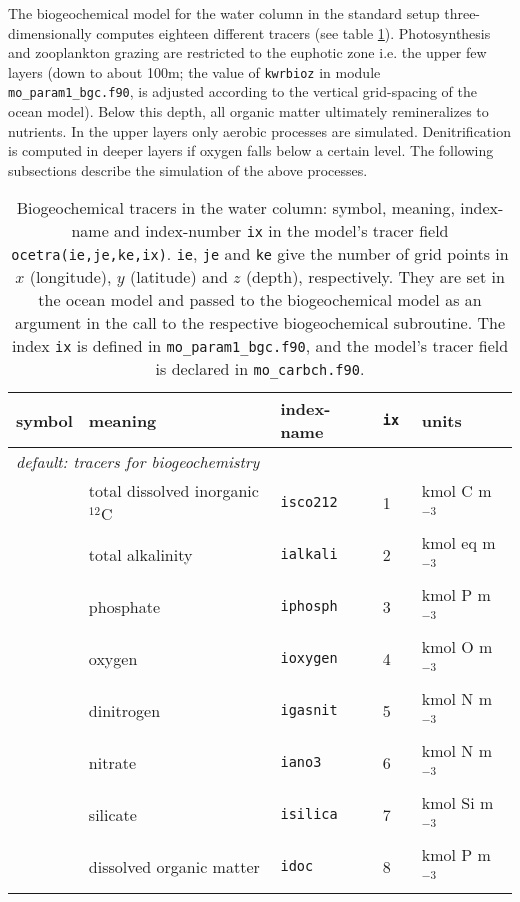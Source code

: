\documentclass[11pt,a4paper,fleqn,twoside]{article}
\def\pho{\text{\textsc{po$_4$}}\,}
\def\nit{\text{\textsc{no$_3$}}\,}
\def\ntwo{\text{\textsc{n$_2$}}\,}
\def\car{\text{\textsc{c$_T^{12}$}}\,}
\def\oxy{\text{\textsc{o$_2$}}\,}
\def\alk{\text{\textsc{a$_T$}}\,}
\def\sio{\text{\textsc{si(oh)$_4$}}\,}
\def\dom{\text{\textsc{dom}}\,}
\newcommand{\concP}{kmol P m$^{-3}$\,}
\newcommand{\concN}{kmol N m$^{-3}$\,}
\newcommand{\concC}{kmol C m$^{-3}$\,}
\newcommand{\concO}{kmol O m$^{-3}$\,}
\newcommand{\concSi}{kmol Si m$^{-3}$\,}
\newcommand{\concalk}{kmol eq m$^{-3}$\,}
\begin{document}
The biogeochemical model for the water column in the standard setup three-dimensionally
computes eighteen different tracers (see table \ref{tab_water_tracers}). 
Photosynthesis and zooplankton grazing are restricted to the euphotic zone i.e. the  upper few layers
(down to about 100m; the value of {\tt kwrbioz} in module {\tt
mo\_param1\_bgc.f90}, is adjusted according to the vertical grid-spacing of the
ocean model). Below this
depth, all organic matter ultimately remineralizes to nutrients. In the
upper layers only aerobic processes are simulated. Denitrification is computed in
deeper layers if oxygen falls below a certain level. The following
subsections describe the simulation of the above processes.

\begin{table}[hbt]
\vspace{.2cm}
\caption{\label{tab_water_tracers} Biogeochemical tracers in the water
column: symbol, meaning, index-name and index-number {\tt ix} in the model's tracer field
{\tt ocetra(ie,je,ke,ix)}. {\tt ie}, {\tt je} and {\tt ke} give the
number of grid points in $x$ (longitude), $y$ (latitude) and $z$ (depth),
respectively. They are set in the ocean model and passed to the biogeochemical
model as an argument in the call to the respective biogeochemical subroutine. 
The index {\tt ix} is defined in {\tt mo\_param1\_bgc.f90}, and the model's
tracer field is declared in {\tt mo\_carbch.f90}.} 
\vspace{.2cm}
\begin{center}
\begin{tabular}{lllll} \hline
symbol & meaning        & index-name   & {\tt ix } & units\\ \hline
\multicolumn{5}{l}{\rule{0mm}{4mm}{\it default: tracers for
biogeochemistry}}\\ \hline
\car & total dissolved inorganic $^{12}$C         & {\tt isco212} & 1     &\concC\\
\alk & total alkalinity &{\tt ialkali}  & 2     & \concalk\\
\pho & phosphate        & {\tt iphosph} & 3     &\concP\\
\oxy & oxygen           &{\tt ioxygen}  & 4     &\concO\\
\ntwo& dinitrogen       & {\tt igasnit} & 5     &\concN\\
\nit & nitrate          & {\tt iano3}   & 6     &\concN\\
\sio & silicate         & {\tt isilica} & 7     &\concSi\\
\dom & dissolved organic matter & {\tt idoc}& 8 &\concP\\

\end{tabular}
\end{center}
\end{table}
\end{document}
